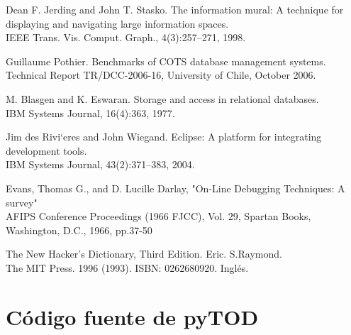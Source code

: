 \documentclass[12pt,legalpaper]{report}
\begin{document}
\begin{thebibliography}{30}
 Dean F. Jerding and John T. Stasko. The information mural: A technique for displaying and navigating large information spaces.\\
IEEE Trans. Vis. Comput. Graph., 4(3):257–271, 1998.

 Guillaume Pothier. Benchmarks of COTS database management systems. \\
Technical Report TR/DCC-2006-16, University of Chile, October 2006.

M. Blasgen and K. Eswaran. Storage and access in relational databases. \\
IBM Systems Journal, 16(4):363, 1977.

 Jim des Rivi`eres and John Wiegand. Eclipse: A platform for integrating development tools.\\
IBM Systems Journal, 43(2):371–383, 2004.

 Evans, Thomas G., and D. Lucille Darlay, "On-Line Debugging Techniques: A survey"\\
AFIPS Conference Proceedings (1966 FJCC), Vol. 29, Spartan Books, Washington, D.C., 1966, pp.37-50


 The New Hacker's Dictionary,  Third Edition. Eric. S.Raymond. \\
The MIT Press. 1996 (1993). ISBN: 0262680920. Inglés.


\end{thebibliography}

\appendix
\appendixpage
\addappheadtotoc
\pagebreak
\chapter{Código fuente de pyTOD}
\end{document}
